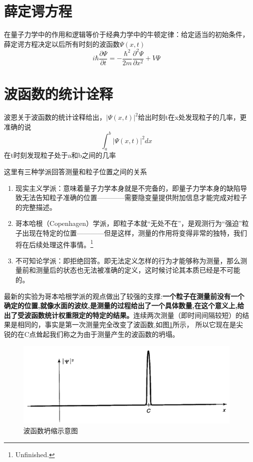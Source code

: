 	\section{薛定谔方程}
		在量子力学中的作用和逻辑等价于经典力学中的牛顿定律：给定适当的初始条件，薛定谔方程决定以后所有时刻的波函数$\Psi (x,t)$
		\begin{equation}
		\boxed{i \hbar \frac{\partial \Psi}{\partial t}=-\frac{\hbar^{2}}{2 m} \frac{\partial^{2} \Psi}{\partial x^{2}}+V \Psi}
			\end{equation}
	\section{波函数的统计诠释}
		波恩关于波函数的统计诠释给出，$|\Psi (x,t)|^2$给出时刻t在x处发现粒子的几率，更准确的说
		\begin{equation}
			\int_{a}^{b}|\Psi(x, t)|^{2} d x
		\end{equation}
		在t时刻发现粒子处于a和b之间的几率

		这里有三种学派回答测量和粒子位置之间的关系
		\begin{enumerate}
		\item 现实主义学派：意味着量子力学本身就是不完备的，即量子力学本身的缺陷导致无法告知粒子准确的位置————需要隐变量提供附加信息才能完成对粒子的完整描述。
		\item 哥本哈根（Copenhagen）学派，即粒子本就“无处不在”，是观测行为“强迫”粒子出现在特定的位置————但是这样，测量的作用将变得非常的独特，我们将在后续处理这件事情。\footnote{Unfinished.}
		\item 不可知论学派：即拒绝回答。即无法定义怎样的行为才能够称为测量，那么测量前和测量后的状态也无法被准确的定义，这时候讨论其本质已经是不可能的。
		\end{enumerate}
		
		最新的实验为哥本哈根学派的观点做出了较强的支撑:\textbf{一个粒子在测量前没有一个确定的位置,就像水面的波纹,是测量的过程给出了一个具体数量,在这个意义上,给出了受波函数统计权重限定的特定的结果。}连续两次测量（即时间间隔较短）的结果是相同的，事实是第一次测量完全改变了波函数,如图\ref{fig.WavefunctionCollapse}所示， 所以它现在是尖锐的在C点耸起我们称之为由于测量产生的波函数的坍塌。
		\begin{figure}[H]
			\centering
			\includegraphics[width=0.5\linewidth]{sections/fig/WavefunctionCollapse.png}
			\caption{波函数坍缩示意图} 
			\label{fig.WavefunctionCollapse}
		\end{figure}
